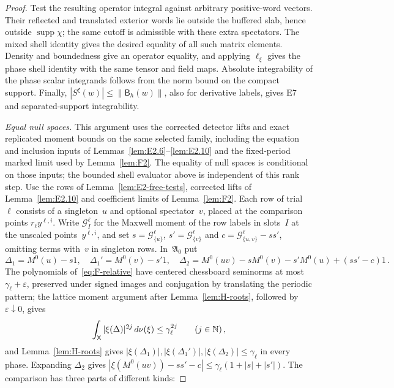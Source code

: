 \begin{proof}
Test the resulting operator integral against arbitrary positive-word vectors. Their reflected and translated exterior words lie outside the buffered slab, hence outside $\operatorname{supp}\chi$; the same cutoff is admissible with these extra spectators. The mixed shell identity gives the desired equality of all such matrix elements. Density and boundedness give an operator equality, and applying $\ell_\xi$ gives the phase shell identity with the same tensor and field maps. Absolute integrability of the phase scalar integrands follows from the norm bound on the compact support. Finally, $|S^\xi(w)|\le\|\mathsf B_h(w)\|$, also for derivative labels, gives E7 and separated-support integrability.

\emph{Equal null spaces.} This argument uses the corrected detector lifts and exact replicated moment bounds on the same selected family, including the equation and inclusion inputs of Lemmas~\ref{lem:E2.6}--\ref{lem:E2.10} and the fixed-period marked limit used by Lemma~\ref{lem:F2}. The equality of null spaces is conditional on those inputs; the bounded shell evaluator above is independent of this rank step. Use the rows of Lemma~\ref{lem:E2-free-tests}, corrected lifts of Lemma~\ref{lem:E2.10} and coefficient limits of Lemma~\ref{lem:F2}. Each row of trial~$\ell$ consists of a singleton~$u$ and optional spectator~$v$, placed at the comparison points $r_\ell y^{\ell,i}$. Write $\mathcal G_I^\ell$ for the Maxwell moment of the row labels in slots~$I$ at the unscaled points~$y^{\ell,i}$, and set $s=\mathcal G^\ell_{\{u\}}$, $s'=\mathcal G^\ell_{\{v\}}$ and $c=\mathcal G^\ell_{\{u,v\}}-ss'$, omitting terms with~$v$ in singleton rows. In~$\mathfrak A_0$ put
\begin{equation*}
\Delta_1=M^0(u)-s1,\quad\Delta_1'=M^0(v)-s'1,\quad
\Delta_2=M^0(uv)-sM^0(v)-s'M^0(u)+(ss'-c)1\,.
\end{equation*}
The polynomials of~\eqref{eq:F-relative} have centered chessboard seminorms at most $\gamma_\ell+\varepsilon$, preserved under signed images and conjugation by translating the periodic pattern; the lattice moment argument after Lemma~\ref{lem:H-roots}, followed by $\varepsilon\downarrow0$, gives
\begin{equation}\label{eq:H-moments}
\int_{\mathsf{X}}|\xi(\Delta)|^{2j}\,d\nu(\xi)\le\gamma_\ell^{2j}\qquad(j\in\mathbb{N})\,,
\end{equation}
and Lemma~\ref{lem:H-roots} gives $|\xi(\Delta_1)|,|\xi(\Delta_1')|,|\xi(\Delta_2)|\le\gamma_\ell$ in every phase. Expanding $\Delta_2$ gives $|\xi(M^0(uv))-ss'-c|\le\gamma_\ell(1+|s|+|s'|)$. The comparison has three parts of different kinds:

\end{proof}
